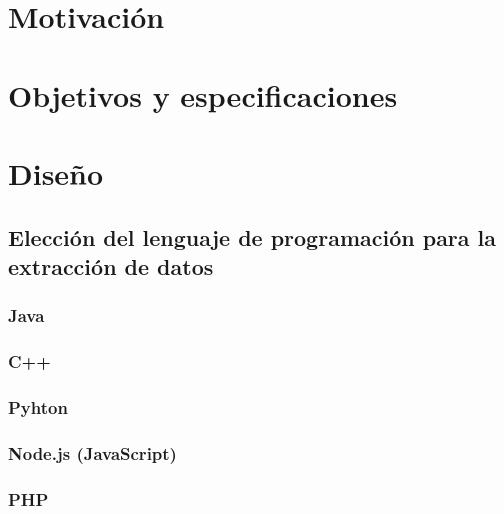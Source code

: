 \documentclass[a4paper,openright,11pt]{book}
\begin{document}



\cleardoublepage
{}
\tableofcontents
%




\chapter{Motivación}
\chapter{Objetivos y especificaciones}
\chapter{Diseño}
\setcounter{section}{0}
\section{Elección del lenguaje de programación para la extracción de datos}
\subsection{Java}
\subsection{C++}
\subsection{Pyhton}
\subsection{Node.js (JavaScript)}
\subsection{PHP}
\end{document}
